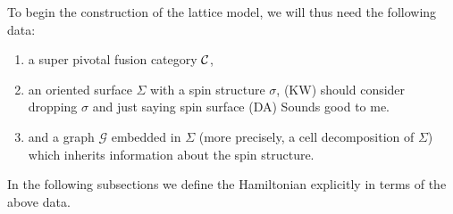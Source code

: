 \documentclass[12pt,a4paper]{article}
\newcommand{\mcg}{\mathcal{G}}
\newcommand{\mcc}{\mathcal{C}}
\newcommand{\dave}[1]{{\color{ao(english)}\footnotesize{(DA) #1}}}
\newcommand{\ethan}[1]{{\color{amethyst}\footnotesize{(EL) #1}}}
\newcommand{\kw}[1]{{\color{kwcolor}\footnotesize{(KW) #1}}}
\begin{document}
To begin the construction of the lattice model, we will thus need the following data:
\begin{enumerate}
\item a super pivotal fusion category ${\cal C}$,
\item an oriented surface $\Sigma$ with a spin structure $\sigma$,
\kw{should consider dropping $\sigma$ and just saying spin surface \dave{Sounds good to me.}}
\item and a graph $\mcg$ embedded in $\Sigma$ (more precisely, a cell decomposition of $\Sigma$) which inherits information about the spin structure.
\end{enumerate}
In the following subsections we define the Hamiltonian explicitly in terms of the above data.
\end{document}
